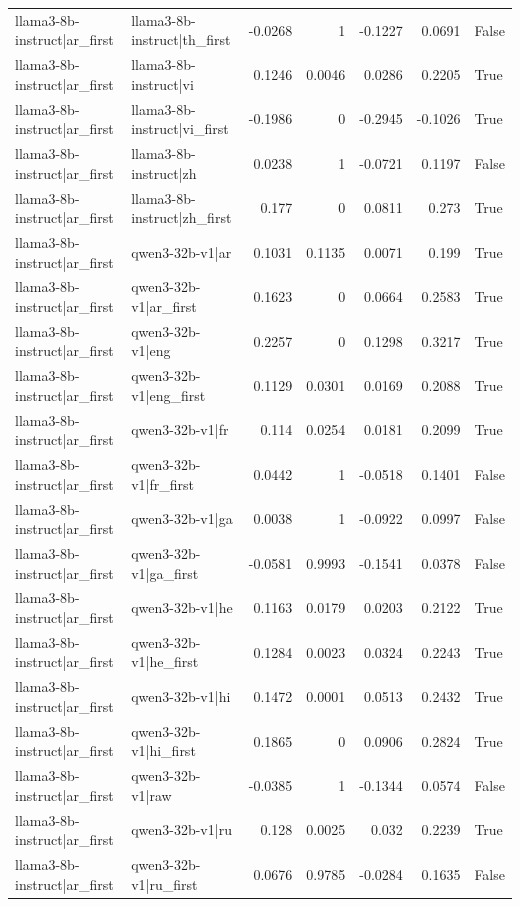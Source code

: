 \begin{table}
\begin{tabular}{l l r r r r l}
llama3-8b-instruct|ar_first & llama3-8b-instruct|th_first & -0.0268 & 1 & -0.1227 & 0.0691 & False \\
llama3-8b-instruct|ar_first & llama3-8b-instruct|vi & 0.1246 & 0.0046 & 0.0286 & 0.2205 & True \\
llama3-8b-instruct|ar_first & llama3-8b-instruct|vi_first & -0.1986 & 0 & -0.2945 & -0.1026 & True \\
llama3-8b-instruct|ar_first & llama3-8b-instruct|zh & 0.0238 & 1 & -0.0721 & 0.1197 & False \\
llama3-8b-instruct|ar_first & llama3-8b-instruct|zh_first & 0.177 & 0 & 0.0811 & 0.273 & True \\
llama3-8b-instruct|ar_first & qwen3-32b-v1|ar & 0.1031 & 0.1135 & 0.0071 & 0.199 & True \\
llama3-8b-instruct|ar_first & qwen3-32b-v1|ar_first & 0.1623 & 0 & 0.0664 & 0.2583 & True \\
llama3-8b-instruct|ar_first & qwen3-32b-v1|eng & 0.2257 & 0 & 0.1298 & 0.3217 & True \\
llama3-8b-instruct|ar_first & qwen3-32b-v1|eng_first & 0.1129 & 0.0301 & 0.0169 & 0.2088 & True \\
llama3-8b-instruct|ar_first & qwen3-32b-v1|fr & 0.114 & 0.0254 & 0.0181 & 0.2099 & True \\
llama3-8b-instruct|ar_first & qwen3-32b-v1|fr_first & 0.0442 & 1 & -0.0518 & 0.1401 & False \\
llama3-8b-instruct|ar_first & qwen3-32b-v1|ga & 0.0038 & 1 & -0.0922 & 0.0997 & False \\
llama3-8b-instruct|ar_first & qwen3-32b-v1|ga_first & -0.0581 & 0.9993 & -0.1541 & 0.0378 & False \\
llama3-8b-instruct|ar_first & qwen3-32b-v1|he & 0.1163 & 0.0179 & 0.0203 & 0.2122 & True \\
llama3-8b-instruct|ar_first & qwen3-32b-v1|he_first & 0.1284 & 0.0023 & 0.0324 & 0.2243 & True \\
llama3-8b-instruct|ar_first & qwen3-32b-v1|hi & 0.1472 & 0.0001 & 0.0513 & 0.2432 & True \\
llama3-8b-instruct|ar_first & qwen3-32b-v1|hi_first & 0.1865 & 0 & 0.0906 & 0.2824 & True \\
llama3-8b-instruct|ar_first & qwen3-32b-v1|raw & -0.0385 & 1 & -0.1344 & 0.0574 & False \\
llama3-8b-instruct|ar_first & qwen3-32b-v1|ru & 0.128 & 0.0025 & 0.032 & 0.2239 & True \\
llama3-8b-instruct|ar_first & qwen3-32b-v1|ru_first & 0.0676 & 0.9785 & -0.0284 & 0.1635 & False \\

\end{tabular}
\end{table}
